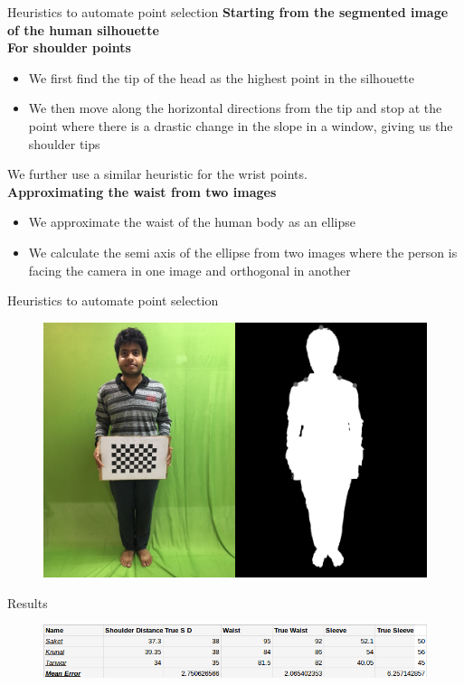 \documentclass{beamer}
\begin{document}
\begin{frame}[t]{Heuristics to automate point selection}
\textbf{Starting from the segmented image of the human silhouette} \\
\smallskip
\quad \textbf{For shoulder points}
\begin{itemize}
    \item We first find the tip of the head as the highest point in the silhouette
    \item We then move along the horizontal directions from the tip and stop at the point where there is a drastic change in the slope in a window, giving us the shoulder tips
\end{itemize}
\smallskip
\quad We further use a similar heuristic for the wrist points. \\
\smallskip
\quad \textbf{Approximating the waist from two images}
\begin{itemize}
    \item We approximate the waist of the human body as an ellipse
    \item We calculate the semi axis of the ellipse from two images where the person is facing the camera in one image and orthogonal in another
\end{itemize}
\end{frame}


\begin{frame}[t]{Heuristics to automate point selection}
\begin{figure}[h]
\includegraphics[width=\textwidth]{detected_r.jpg}
\end{figure}
\end{frame}


\begin{frame}{Results}
\begin{figure}[h]
\includegraphics[width=\textwidth]{yeh.png}
\end{figure}
\end{frame}
\end{document}
